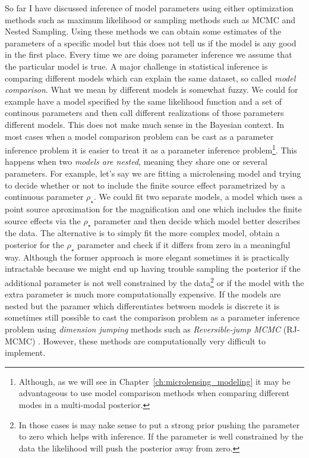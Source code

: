 \documentclass[12pt,dvipsnames]{report}
\begin{document}
So far I have discussed inference of model parameters using either optimization 
methods such as maximum likelihood or sampling methods such as MCMC and Nested 
Sampling.
Using these methods we can obtain some estimates of the parameters of a specific  
model but this  does not tell us if the model is any good in the first place.
Every time we are doing parameter inference we assume that the particular model
is true.
A major challenge in statistical inference is comparing different 
models which can explain the same dataset, so called \textsl{model comparison}.
What we mean by different models is somewhat fuzzy. We could for example have 
a model specified by the same likelihood function and a set of continous 
parameters and then call different realizations of those parameters different 
models. This does not make much sense in the Bayesian context. In most cases
when a model comparison problem can be cast as a parameter inference problem it 
is easier to treat it as a parameter inference problem\footnote{Although, as we
will see in Chapter~\ref{ch:microlensing_modeling} it may be advantageous  to use model 
comparison methods when comparing different modes in a multi-modal posterior.}.
This happens when two \emph{models are nested}, meaning they share one or 
several parameters.
For example, let's say we are fitting a microlensing model and trying to decide 
whether  or not to include the finite source effect parametrized by a continuous 
parameter $\rho_\star$.
We could fit two separate models, a model which uses a point source 
aproximation for the magnification and one which includes the finite source 
effects via the $\rho_\star$ parameter and then decide which model better 
describes the data. The alternative is to simply fit the more complex model, 
obtain a posterior for the $\rho_\star$ parameter and check if it differs from 
zero in a meaningful way. Although the former approach is more elegant sometimes
it is practically intractable because we might end up having trouble sampling 
the posterior if the additional parameter is not well constrained by the data\footnote{In those
cases is may nake sense to put a strong prior pushing the parameter to zero which 
helps with inference. If the parameter is well constrained by the data the 
likelihood will push the posterior away from zero.} or if the model with the 
extra parameter is much more computationally expensive. 
If the models are nested but the paramer which differentiates between models is 
discrete it is sometimes still possible to cast the comparison problem as a parameter 
inference problem using \emph{dimension jumping} methods such as 
\textsl{Reversible-jump MCMC} (RJ-MCMC)
\citep[See][for an application of a method similar to RJ-MCMC to an 
astronomy problem]{2015MNRAS.448.3206B}.
However, these methods are computationally very difficult to implement.
\end{document}
